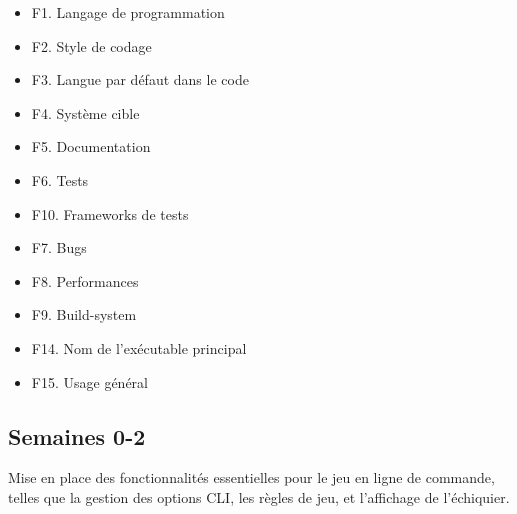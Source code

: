 \documentclass{article}
\begin{document}
\begin{itemize}
    \item F1. Langage de programmation
    \item F2. Style de codage
    \item F3. Langue par défaut dans le code
    \item F4. Système cible
    \item F5. Documentation
    \item F6. Tests
    \item F10. Frameworks de tests
    \item F7. Bugs
    \item F8. Performances
    \item F9. Build-system
    \item F14. Nom de l'exécutable principal
    \item F15. Usage général
\end{itemize}

\subsection{Semaines 0-2}

Mise en place des fonctionnalités essentielles pour le jeu en ligne de commande, telles que la gestion des options CLI, les règles de jeu, et l'affichage de l'échiquier.
\end{document}
